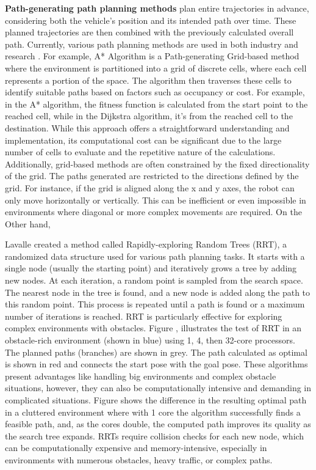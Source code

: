 \textbf{Path-generating path planning methods} plan entire trajectories in advance, considering both the 
vehicle's position and its intended path over time. These planned trajectories are then combined with 
the previously calculated overall path. Currently, various path planning methods are used in both industry 
and research \cite{R28}.
For example, A* Algorithm is a Path-generating Grid-based method where
the environment is partitioned into a grid of discrete cells, where each cell represents a 
portion of the space. 
The algorithm then traverses these cells to identify suitable paths based on factors such as occupancy 
or cost. For example, in the A* algorithm, the fitness function is calculated from the start point 
to the reached cell, while in the Dijkstra algorithm, it's from the reached cell to the destination. 
While this approach offers a straightforward understanding and implementation, its computational cost 
can be significant due to the large number of cells to evaluate and the repetitive nature of the 
calculations. Additionally, grid-based methods are often constrained by the fixed directionality 
of the grid. The paths generated are restricted to the directions defined by the grid. 
For instance, if the grid is aligned along the x and y axes, the robot can only move horizontally 
or vertically. This can be inefficient or even impossible in environments where diagonal 
or more complex movements are required.
On the Other hand, 

Lavalle \cite{R47} created a method called Rapidly-exploring Random Trees (RRT), a randomized data structure used 
for various path planning tasks. It starts with a single node (usually the starting point)
and iteratively grows a tree by adding new nodes. At each iteration, a random point is sampled from 
the search space. The nearest node in the tree is found, and a new node is added along the path to 
this random point. This process is repeated until a path is found or a maximum number of iterations 
is reached. RRT is particularly effective for exploring complex environments with obstacles. 
Figure , illustrates the test of RRT in an obstacle-rich environment (shown in blue)
using 1, 4, then 32-core processors. The planned paths (branches) are shown in grey. 
The path calculated as optimal is shown in red and connects the start pose with the goal pose.
These algorithms present advantages like handling big environments and complex obstacle
situations, however, they can also be computationally intensive and demanding in complicated situations.
Figure  shows the difference in the resulting optimal path in a cluttered environment where with
1 core the algorithm successfully finds a feasible path, and, as the cores double, the computed path
improves its quality as the search tree expands. 
RRTs require collision checks for each new node, which can be computationally expensive and memory-intensive, 
especially in environments with numerous obstacles, heavy traffic, or complex paths.


